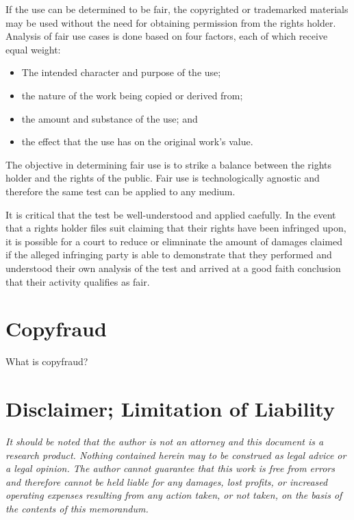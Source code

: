 \documentclass[letterpaper,11pt]{texMemo}
\begin{document}
  If the use can be determined to be fair, the copyrighted or trademarked materials may be used without the need for obtaining permission from the rights holder. Analysis of fair use cases is done based on four factors, each of which receive equal weight:
    \begin{itemize}
      \item The intended character and purpose of the use;
      \item the nature of the work being copied or derived from;
      \item the amount and substance of the use; and
      \item the effect that the use has on the original work's value.
    \end{itemize}
  The objective in determining fair use is to strike a balance between the rights holder and the rights of the public. Fair use is technologically agnostic and therefore the same test can be applied to any medium.

  It is critical that the test be well-understood and applied caefully. In the event that a rights holder files suit claiming that their rights have been infringed upon, it is possible for a court to reduce or elimninate the amount of damages claimed if the alleged infringing party is able to demonstrate that they performed and understood their own analysis of the test and arrived at a good faith conclusion that their activity qualifies as fair.





\section*{Copyfraud}
  What is copyfraud?

\section*{Disclaimer; Limitation of Liability}
\emph{It should be noted that the author is not an attorney and this document is a research product. Nothing contained herein may to be construed as legal advice or a legal opinion. The author cannot guarantee that this work is free from errors and therefore cannot be held liable for any damages, lost profits, or increased operating expenses resulting from any action taken, or not taken, on the basis of the contents of this memorandum.}


\end{document}
